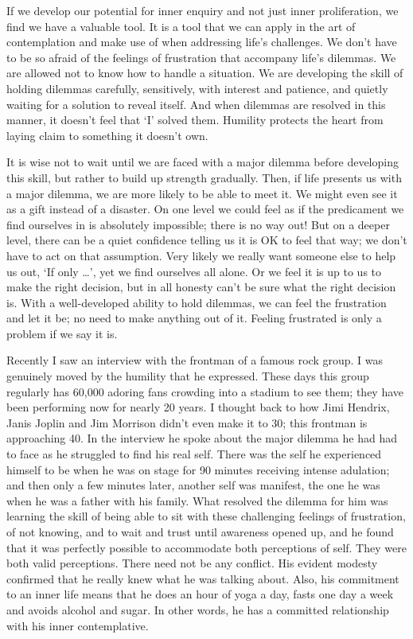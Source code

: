 If we develop our potential for inner enquiry and not just inner
proliferation, we find we have a valuable tool. It is a tool that we can
apply in the art of contemplation and make use of when addressing life’s
challenges. We don’t have to be so afraid of the feelings of frustration
that accompany life’s dilemmas. We are allowed not to know how to handle
a situation. We are developing the skill of holding dilemmas carefully,
sensitively, with interest and patience, and quietly waiting for a
solution to reveal itself. And when dilemmas are resolved in this
manner, it doesn’t feel that ‘I’ solved them. Humility protects the
heart from laying claim to something it doesn’t own.

It is wise not to wait until we are faced with a major dilemma before
developing this skill, but rather to build up strength gradually. Then,
if life presents us with a major dilemma, we are more likely to be able
to meet it. We might even see it as a gift instead of a disaster. On one
level we could feel as if the predicament we find ourselves in is
absolutely impossible; there is no way out! But on a deeper level, there
can be a quiet confidence telling us it is OK to feel that way; we don’t
have to act on that assumption. Very likely we really want someone else
to help us out, ‘If only …​’, yet we find ourselves all alone. Or we
feel it is up to us to make the right decision, but in all honesty can’t
be sure what the right decision is. With a well-developed ability to
hold dilemmas, we can feel the frustration and let it be; no need to
make anything out of it. Feeling frustrated is only a problem if we say
it is.

Recently I saw an interview with the frontman of a famous rock group. I
was genuinely moved by the humility that he expressed. These days this
group regularly has 60,000 adoring fans crowding into a stadium to see
them; they have been performing now for nearly 20 years. I thought back
to how Jimi Hendrix, Janis Joplin and Jim Morrison didn’t even make it
to 30; this frontman is approaching 40. In the interview he spoke about
the major dilemma he had had to face as he struggled to find his real
self. There was the self he experienced himself to be when he was on
stage for 90 minutes receiving intense adulation; and then only a few
minutes later, another self was manifest, the one he was when he was a
father with his family. What resolved the dilemma for him was learning
the skill of being able to sit with these challenging feelings of
frustration, of not knowing, and to wait and trust until awareness
opened up, and he found that it was perfectly possible to accommodate
both perceptions of self. They were both valid perceptions. There need
not be any conflict. His evident modesty confirmed that he really knew
what he was talking about. Also, his commitment to an inner life means
that he does an hour of yoga a day, fasts one day a week and avoids
alcohol and sugar. In other words, he has a committed relationship with
his inner contemplative.

